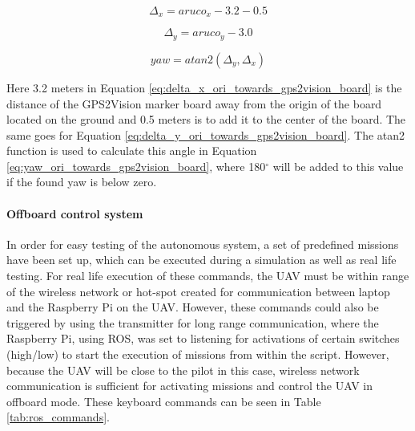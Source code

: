 \documentclass[../Head/report.tex]{subfiles}
\begin{document}
\begin{equation}
	\Delta_x = aruco_x - 3.2 - 0.5
	\label{eq:delta_x_ori_towards_gps2vision_board}
\end{equation}

\begin{equation}
	\Delta_y = aruco_y - 3.0
	\label{eq:delta_y_ori_towards_gps2vision_board}
\end{equation}

\begin{equation}
	yaw = atan2(\Delta_y, \Delta_x)
	\label{eq:yaw_ori_towards_gps2vision_board}
\end{equation}

Here 3.2 meters in Equation \ref{eq:delta_x_ori_towards_gps2vision_board} is the distance of the GPS2Vision marker board away from the origin of the board located on the ground and 0.5 meters is to add it to the center of the board. The same goes for Equation \ref{eq:delta_y_ori_towards_gps2vision_board}. The atan2 function is used to calculate this angle in Equation \ref{eq:yaw_ori_towards_gps2vision_board}, where 180$^{\circ}$ will be added to this value if the found yaw is below zero. 

\paragraph{Offboard control system}
\label{sec:offboard_control_system}

In order for easy testing of the autonomous system, a set of predefined missions have been set up, which can be executed during a simulation as well as real life testing. For real life execution of these commands, the UAV must be within range of the wireless network or hot-spot created for communication between laptop and the Raspberry Pi on the UAV. However, these commands could also be triggered by using the transmitter for long range communication, where the Raspberry Pi, using ROS, was set to listening for activations of certain switches (high/low) to start the execution of missions from within the script. However, because the UAV will be close to the pilot in this case, wireless network communication is sufficient for activating missions and control the UAV in offboard mode. These keyboard commands can be seen in Table \ref{tab:ros_commands}.  
\end{document}
